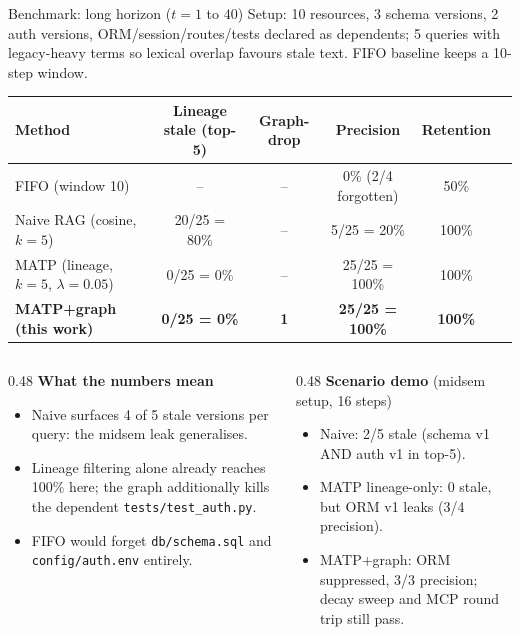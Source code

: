 \documentclass[aspectratio=169,10pt]{beamer}
\begin{document}
\begin{frame}{Benchmark: long horizon ($t=1$ to $40$)}
  {\footnotesize Setup: 10 resources, 3 schema versions, 2 auth versions, ORM/session/routes/tests declared as dependents; 5 queries with legacy-heavy terms so lexical overlap favours stale text. FIFO baseline keeps a 10-step window.}

  \vspace{0.3em}
  \begin{table}
    \centering
    \footnotesize
    \begin{tabular}{lccccc}
      \toprule
      Method & Lineage stale (top-5) & Graph-drop & Precision & Retention\\
      \midrule
      FIFO (window 10) & -- & -- & 0\% (2/4 forgotten) & 50\%\\
      Naive RAG (cosine, $k=5$) & 20/25 = 80\% & -- & 5/25 = 20\% & 100\%\\
      MATP (lineage, $k=5$, $\lambda=0.05$) & 0/25 = 0\% & -- & 25/25 = 100\% & 100\%\\
      \textbf{MATP+graph (this work)} & \textbf{0/25 = 0\%} & \textbf{1} & \textbf{25/25 = 100\%} & \textbf{100\%}\\
      \bottomrule
    \end{tabular}
  \end{table}

  \begin{columns}[T,onlytextwidth]
    \begin{column}{0.48\textwidth}
      {\footnotesize \textbf{What the numbers mean}}
      \begin{itemize}
        \footnotesize
        \item Naive surfaces 4 of 5 stale versions per query: the midsem leak generalises.
        \item Lineage filtering alone already reaches 100\% here; the graph additionally kills the dependent \texttt{tests/test\_auth.py}.
        \item FIFO would forget \texttt{db/schema.sql} and \texttt{config/auth.env} entirely.
      \end{itemize}
    \end{column}
    \begin{column}{0.48\textwidth}
      {\footnotesize \textbf{Scenario demo} (midsem setup, 16 steps)}
      \begin{itemize}
        \footnotesize
        \item Naive: 2/5 stale (schema v1 AND auth v1 in top-5).
        \item MATP lineage-only: 0 stale, but ORM v1 leaks (3/4 precision).
        \item MATP+graph: ORM suppressed, 3/3 precision; decay sweep and MCP round trip still pass.
      \end{itemize}
    \end{column}
  \end{columns}
\end{frame}
\end{document}
